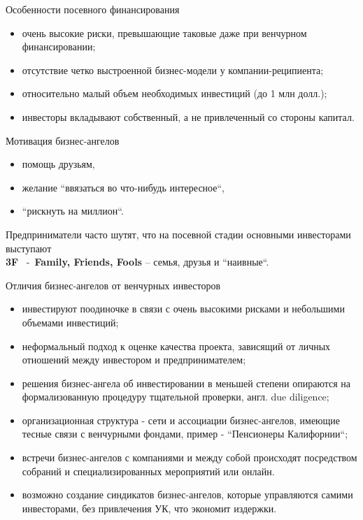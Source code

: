 \documentclass[_Venture_p2.tex]{subfiles}
\begin{document}
\begin{frame}[allowframebreaks]{Особенности посевного финансирования}{}
\begin{itemize}
	\item очень высокие риски, превышающие таковые даже при венчурном финансировании;
	\item отсутствие четко выстроенной бизнес-модели у компании-реципиента;
	\item относительно малый объем необходимых инвестиций (до 1 млн долл.);
	\item инвесторы вкладывают собственный, а не привлеченный со стороны капитал.	
\end{itemize}
\end{frame}

\begin{frame}[allowframebreaks]{Мотивация бизнес-ангелов}{}
\begin{itemize}
	\item помощь друзьям, 
	\item желание ``ввязаться во что-нибудь интересное``, 
	\item ``рискнуть на миллион``. 
\end{itemize}
Предприниматели часто шутят, что на посевной стадии основными инвесторами выступают\\ \textbf{3F }~-~\textbf{Family, Friends, Fools }– семья, друзья и ``наивные``.
\end{frame}


\begin{frame}[allowframebreaks]{Отличия бизнес-ангелов от венчурных инвесторов}{}
\begin{itemize}
	\item инвестируют поодиночке в связи с очень высокими рисками и небольшими объемами инвестиций; 
	\item неформальный подход к оценке качества проекта, зависящий от личных отношений между инвестором и предпринимателем;
	
	\pagebreak
	\item решения бизнес-ангела об инвестировании в меньшей степени опираются на формализованную процедуру тщательной проверки, англ. due diligence;
	\item организационная структура - сети и ассоциации бизнес-ангелов, имеющие тесные связи с венчурными фондами, пример - ``Пенсионеры Калифорнии``;

	\pagebreak
	\item встречи бизнес-ангелов с компаниями и между собой происходят посредством собраний и специализированных мероприятий или онлайн. 
	\item возможно создание синдикатов бизнес-ангелов, которые управляются самими инвесторами, без привлечения УК, что экономит издержки.
\end{itemize}
\end{frame}
\end{document}
